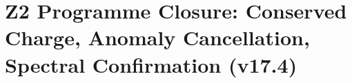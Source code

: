 \documentclass[12pt, a4paper]{article}
\begin{document}
%
%
%




\part{Z2 Programme Closure: Conserved Charge, Anomaly Cancellation, Spectral Confirmation (v17.4)}
\end{document}
